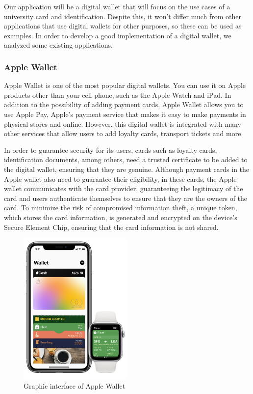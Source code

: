 \documentclass[10pt]{article}
\begin{document}
Our application will be a digital wallet that will focus on the use cases of a university card and identification. Despite this, it won't differ much from other applications that use digital wallets for other purposes, so these can be used as examples. In order to develop a good implementation of a digital wallet, we analyzed some existing applications.

\subsubsection{Apple Wallet}
Apple Wallet is one of the most popular digital wallets. You can use it on Apple products other than your cell phone, such as the Apple Watch and iPad. In addition to the possibility of adding payment cards, Apple Wallet allows you to use Apple Pay, Apple's payment service that makes it easy to make payments in physical stores and online. However, this digital wallet is integrated with many other services that allow users to add loyalty cards, transport tickets and more.

In order to guarantee security for its users, cards such as loyalty cards, identification documents, among others, need a trusted certificate to be added to the digital wallet, ensuring that they are genuine.
Although payment cards in the Apple wallet also need to guarantee their eligibility, in these cards, the Apple wallet communicates with the card provider, guaranteeing the legitimacy of the card and users authenticate themselves to ensure that they are the owners of the card. To minimize the risk of compromised information theft, a unique token, which stores the card information, is generated and encrypted on the device's Secure Element Chip, ensuring that the card information is not shared.

\begin{figure}[H]
    \centering
    \includegraphics[width=0.5\textwidth]{report-images/apple-wallet.png}
    \caption{Graphic interface of Apple Wallet}
    \label{fig:my_label}
\end{figure}
\end{document}
